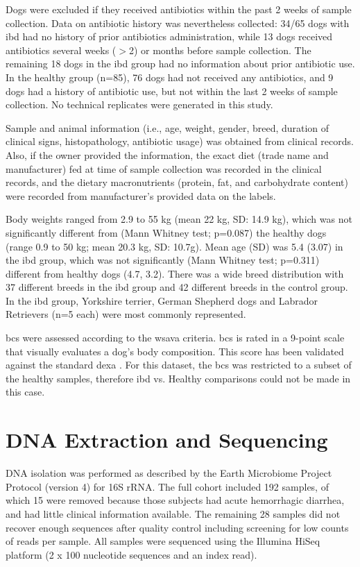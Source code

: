 Dogs were excluded if they received antibiotics within the past 2 weeks of sample collection. Data on antibiotic history was nevertheless collected: 34/65 dogs with \gls{ibd} had no history of prior antibiotics administration, while 13 dogs received antibiotics several weeks ($>$2) or months before sample collection. The remaining 18 dogs in the \gls{ibd} group had no information about prior antibiotic use. In the healthy group (n=85), 76 dogs had not received any antibiotics, and 9 dogs had a history of antibiotic use, but not within the last 2 weeks of sample collection. No technical replicates were generated in this study.

Sample and animal information (i.e., age, weight, gender, breed, duration of clinical signs, histopathology, antibiotic usage) was obtained from clinical records. Also, if the owner provided the information, the exact diet (trade name and manufacturer) fed at time of sample collection was recorded in the clinical records, and the dietary macronutrients (protein, fat, and carbohydrate content) were recorded from manufacturer’s provided data on the labels. 

Body weights ranged from 2.9 to 55 kg (mean 22 kg, SD: 14.9 kg), which was not significantly different from (Mann Whitney test; p=0.087) the healthy dogs (range 0.9 to 50 kg; mean 20.3 kg, SD: 10.7g). Mean age (SD) was 5.4 (3.07) in the \gls{ibd} group, which was not significantly (Mann Whitney test; p=0.311) different from healthy dogs (4.7, 3.2). There was a wide breed distribution with 37 different breeds in the \gls{ibd} group and 42 different breeds in the control group. In the \gls{ibd} group, Yorkshire terrier, German Shepherd dogs and Labrador Retrievers (n=5 each) were most commonly represented.

\Gls{bcs} were assessed according to the \gls{wsava} criteria. \Gls{bcs} is rated in a 9-point scale that visually evaluates a dog’s body composition. This score has been validated against the standard \gls{dexa} \cite{RN4000}. For this dataset, the \Gls{bcs} was restricted to a subset of the healthy samples, therefore \gls{ibd} vs. Healthy comparisons could not be made in this case.

\section{DNA Extraction and Sequencing}

DNA isolation was performed as described by the Earth Microbiome Project Protocol (version 4) for 16S rRNA\cite{RN164}. The full cohort included 192 samples, of which 15 were removed because those subjects had acute hemorrhagic diarrhea, and had little clinical information available. The remaining 28 samples did not recover enough sequences after quality control including screening for low counts of reads per sample. All samples were sequenced using the Illumina HiSeq platform (2 x 100 nucleotide sequences and an index read).

